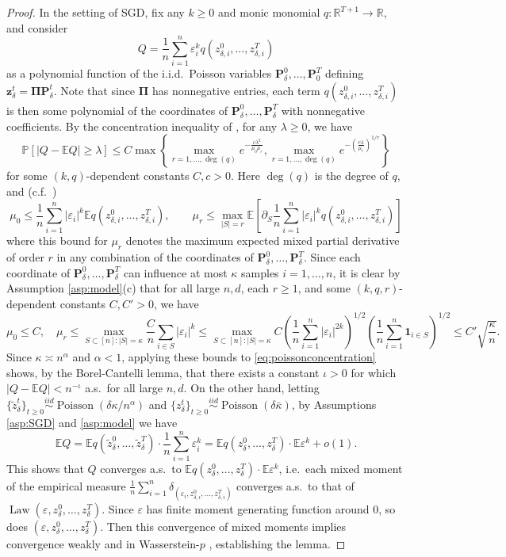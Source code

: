 \documentclass[11pt,letterpaper,reqno]{amsart}
\theoremstyle{definition}
\def\eps{\varepsilon}
\def\P{\mathbb{P}}
\def\E{\mathbb{E}}
\def\R{\mathbb{R}}
\def\Pois{\operatorname{Poisson}}
\def\Law{\operatorname{Law}}
\def\z{\mathbf{z}}
\def\bP{\mathbf{P}}
\def\1{\mathbf{1}}
\def\bPi{\boldsymbol{\Pi}}
\begin{document}
\begin{proof}
In the setting of SGD, fix any $k \geq 0$ and
monic monomial $q:\R^{T+1} \to \R$, and consider 
\[Q=\frac{1}{n}\sum_{i=1}^n \eps_i^k q(z_{\delta,i}^0,\ldots,z_{\delta,i}^T)\]
as a polynomial function of the i.i.d.\ Poisson variables
$\bP_\delta^0,\ldots,\bP_0^T$ defining
$\z_\delta^t=\bPi\bP_\delta^t$. Note that since $\bPi$ has nonnegative entries,
each term $q(z_{\delta,i}^0,\ldots,z_{\delta,i}^T)$ is then some polynomial of
the coordinates of $\bP_\delta^0,\ldots,\bP_\delta^T$ with
nonnegative coefficients. By the concentration inequality of
\cite[Theorem 1.4, Lemma 7.6]{schudy2012concentration}, for any $\lambda \geq 0$, we have
\begin{equation}\label{eq:poissonconcentration}
\P[|Q-\E Q| \geq \lambda]
\leq C\max\left\{\max_{r=1,\ldots,\deg(q)}
e^{-\frac{c\lambda^2}{\mu_0\mu_r}},
\max_{r=1,\ldots,\deg(q)}
e^{-\left(\frac{c\lambda}{\mu_r}\right)^{1/r}}\right\}
\end{equation}
for some $(k,q)$-dependent constants $C,c>0$. Here $\deg(q)$ is the degree of
$q$, and (c.f.\ \cite[Section 1.4]{schudy2012concentration})
\[\mu_0 \leq \frac{1}{n}\sum_{i=1}^n
|\eps_i|^k \E q(z_{\delta,i}^0,\ldots,z_{\delta,i}^T),
\qquad \mu_r \leq \max_{|S|=r} \E\left[\partial_S 
\frac{1}{n}\sum_{i=1}^n 
|\eps_i|^k q(z_{\delta,i}^0,\ldots,z_{\delta,i}^T)\right]\]
where this bound for $\mu_r$ denotes the maximum expected mixed partial
derivative of order $r$ in any combination of the coordinates of
$\bP_\delta^0,\ldots,\bP_\delta^T$. Since
each coordinate of $\bP_\delta^0,\ldots,\bP_\delta^T$ can influence at most
$\kappa$ samples $i=1,\ldots,n$, it is clear by Assumption \ref{asp:model}(c) that 
for all large $n,d$, each $r \geq 1$, and some $(k,q,r)$-dependent constants
$C,C'>0$, we have
\[\mu_0 \leq C,
\quad \mu_r \leq \max_{S \subset [n]:|S|=\kappa} \frac{C}{n}\sum_{i \in S}
|\eps_i|^k
\leq \max_{S \subset [n]:|S|=\kappa}
C\left(\frac{1}{n}\sum_{i=1}^n |\eps_i|^{2k}\right)^{1/2}
\left(\frac{1}{n}\sum_{i=1}^n \1_{i \in S}\right)^{1/2}
\leq C'\sqrt{\frac{\kappa}{n}}.\]
Since $\kappa \asymp n^\alpha$
and $\alpha<1$, applying these bounds to \eqref{eq:poissonconcentration} shows,
by the Borel-Cantelli lemma,
that there exists a constant $\iota>0$ for which $|Q-\E Q|<n^{-\iota}$
a.s.\ for all large $n,d$. On the other hand, letting
$\{\tilde z_\delta^t\}_{t \geq 0} \overset{iid}{\sim}
\Pois(\delta\kappa/n^\alpha)$ and 
$\{z_\delta^t\}_{t \geq 0} \overset{iid}{\sim}
\Pois(\delta\bar \kappa)$, by Assumptions \ref{asp:SGD} and \ref{asp:model}
we have
\[\E Q=\E q(\tilde z_\delta^0,\ldots,\tilde z_\delta^T)
\cdot \frac{1}{n}\sum_{i=1}^n \eps_i^k
=\E q(z_\delta^0,\ldots,z_\delta^T) \cdot \E \eps^k+o(1).\]
This shows that $Q$ converges a.s.\ to $\E q(z_\delta^0,\ldots,z_\delta^T) \cdot
\E \eps^k$, i.e.\ each mixed moment of the empirical measure
$\frac{1}{n}\sum_{i=1}^n
\delta_{(\eps_i,z_{\delta,i}^0,\ldots,z_{\delta,i}^T)}$
converges a.s.\ to that of $\Law(\eps,z_\delta^0,\ldots,z_\delta^T)$.
Since $\eps$ has finite moment generating function around 0, so
does $(\eps,z_\delta^0,\ldots,z_\delta^T)$. Then this convergence of mixed
moments implies convergence weakly and in Wasserstein-$p$
\cite[Thm 6.9]{villani2008optimal}, establishing the lemma.
\end{proof}
\end{document}
